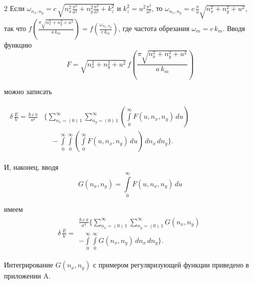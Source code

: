 \documentclass[twoside, 10pt]{article}
\begin{document}
\begin{multicols}{2}
    Если \(\omega _{n_x,n_y} = c\,\sqrt{n_x^2\frac{\pi^2}{a^2}+n_y^2\frac{\pi^2}{a^2}+k_z^2}\)
и \(k_z^2 = u^2 \frac{\pi^2}{a^2}\), то
\(\omega _{n_x,n_y} = c \, \frac{\pi}{a} \sqrt{n_x^2+n_y^2+u^2}\), так что
\(f\left(\frac{\pi\sqrt{n_x^2 + n_y^2+u^2}}{a\,k_m}\right) = f\left(\frac{\omega _{n_x,n_y}}{c\,k_m}\right)\),
где частота обрезания \(\omega_m = c\,k_m\).
    Вводя функцию
\noindent
\begin{equation} \label{eq:4}
F = %
\sqrt{n_x^2 + n_y^2+u^2}\,
f\left(\frac{\pi\sqrt{n_x^2 + n_y^2+u^2}}{a\,k_m}\right)
\end{equation}

    можно записать

\noindent
$\begin{array}{c}
\begin{array}{ll}
\delta\,\frac{E}{V} =
\frac{\hbar\,c\,\pi}{a^4}
&\Bigg\{
\sum\limits_{n_x=\left(0\right)\,1}^{\infty}
\sum\limits_{n_y=\left(0\right)\,1}^{\infty}
\left(\int\limits_{0}^{\infty}F\left(u, n_x, n_y\right)\,d{u}\right)
\\
\, & \,\,\,\,\,\, - \int\limits_{0}^{\infty}
\int\limits_{0}^{\infty}
\left(\int\limits_{0}^{\infty}F\left(u, n_x, n_y\right)\,d{u}\right)
\,d{n_x}\,d{n_y}
\Bigg\}.
\end{array}
\end{array}$

    И, наконец, вводя
\noindent
\begin{equation} \label{eq:5}
G\left(n_x, n_y\right) = \int\limits_{0}^{\infty}F\left(u, n_x, n_y\right)\,d{u}
\end{equation}

    имеем
    \begin{equation} \label{eq:6}
\begin{array}{lr}
\delta\,\frac{E}{V} =
\begin{array}{c}
 \frac{\hbar\,c\,\pi}{a^4} \Bigg\{
\sum\limits_{n_x=\left(0\right)\,1}^{\infty}
\sum\limits_{n_y=\left(0\right)\,1}^{\infty}
G\left(n_x, n_y\right)
\\
- \int\limits_{0}^{\infty}
\int\limits_{0}^{\infty}
G\left(n_x, n_y\right)
\,d{n_x}\,d{n_y}
\Bigg\}.
\end{array}
\end{array}
\end{equation}

Интегрирование \(G\left(n_x, n_y\right)\) с примером регуляризующей функции приведено в приложении A.


\end{multicols}
\end{document}
